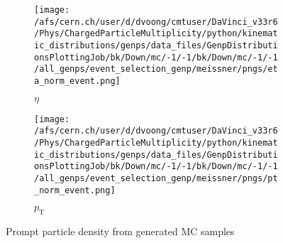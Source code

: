 \begin{figure}[h]
	\centering
	\begin{subfigure}[b]{0.49\textwidth}
		\texttt{[image: /afs/cern.ch/user/d/dvoong/cmtuser/DaVinci\_v33r6/Phys/ChargedParticleMultiplicity/python/kinematic\_distributions/genps/data\_files/GenpDistributionsPlottingJob/bk/Down/mc/-1/-1/bk/Down/mc/-1/-1/all\_genps/event\_selection\_genp/meissner/pngs/eta\_norm\_event.png]}
		\caption{$\eta$}
		\label{fig: gen particle density eta}
         \end{subfigure}
	\begin{subfigure}[b]{0.49\textwidth}
		\texttt{[image: /afs/cern.ch/user/d/dvoong/cmtuser/DaVinci\_v33r6/Phys/ChargedParticleMultiplicity/python/kinematic\_distributions/genps/data\_files/GenpDistributionsPlottingJob/bk/Down/mc/-1/-1/bk/Down/mc/-1/-1/all\_genps/event\_selection\_genp/meissner/pngs/pt\_norm\_event.png]}
		\caption{$p_\mathrm{T}$}
		\label{fig: gen particle density pt}
         \end{subfigure}
         \caption{Prompt particle density from generated MC samples}
	 \label{fig: generated prompt particle density}
\end{figure}